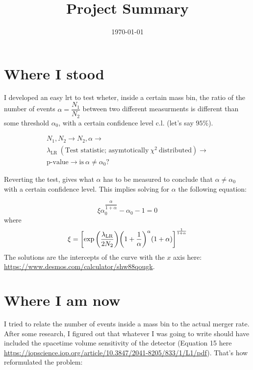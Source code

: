 \documentclass[12pt,a4paper]{article}
\title{Project Summary}
\date{\today}
\begin{document}
\maketitle

\section{Where I stood}
I developed an easy \acrfull{lrt} to test wheter, inside a certain mass bin, the ratio of the number of events \(\alpha = \dfrac{N_1}{N_2}\) between two different measurments is different than some threshold \(\alpha_0\), with a certain confidence level \(\text{c.l.}\) (let's say \(95\%\)).

\begin{multline*}
    N_1, N_2 \longrightarrow N_2, \alpha \longrightarrow \\
    \lambda_\text{LR}\ (\text{Test statistic; asymtotically}\ \chi^2\ \text{distributed}) \longrightarrow \\
    \text{p-value} \longrightarrow \text{is}\ \alpha \neq \alpha_0 \text{?}
\end{multline*}

Reverting the test, gives what \(\alpha\) has to be measured to conclude that \(\alpha \neq \alpha_0\) with a certain confidence level. This implies solving for \(\alpha\) the following equation:

\[\xi \alpha_0^{\dfrac{\alpha}{1 + \alpha}} - \alpha_0 - 1 = 0\]
where
\[\xi = \qty[\exp\qty(\dfrac{\lambda_\text{LR}}{2 N_2}) \qty(1 + \dfrac{1}{\alpha})^\alpha \qty(1 + \alpha)]^\frac{1}{1 + \alpha}\]
The solutions are the intercepts of the curve with the \(x\) axis here: \url{https://www.desmos.com/calculator/shw88qougk}.

\section{Where I am now}

I tried to relate the number of events inside a mass bin to the actual merger rate. After some research, I figured out that whatever I was going to write should have included the spacetime volume sensitivity of the detector (Equation 15 here \url{https://iopscience.iop.org/article/10.3847/2041-8205/833/1/L1/pdf}). That's how reformulated the problem:
\end{document}

